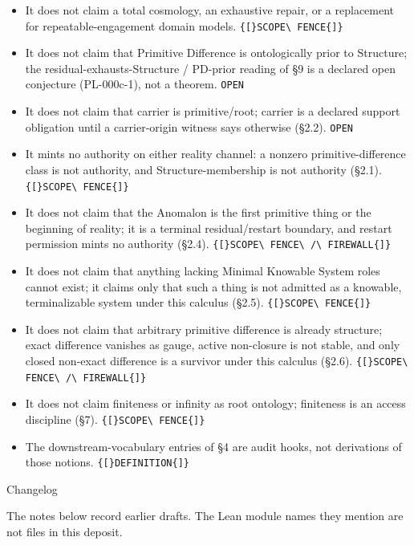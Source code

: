 \documentclass[
  10pt,
]{article}
\providecommand{\tightlist}{%
  \setlength{\itemsep}{0pt}\setlength{\parskip}{0pt}}
\providecommand{\tightlist}{%
  \setlength{\itemsep}{0pt}\setlength{\parskip}{0pt}}
\DeclareRobustCommand{\texttt}[1]{{\paperSymbolFont\nolinkurl{#1}}}
\begin{document}
\begin{itemize}
\tightlist
\item
  It does not claim a total cosmology, an exhaustive repair, or a replacement for repeatable-engagement domain models. \texttt{{[}SCOPE\ FENCE{]}}
\item
  It does not claim that Primitive Difference is ontologically prior to Structure; the residual-exhausts-Structure / PD-prior reading of §9 is a declared open conjecture (PL-000c-1), not a theorem. \texttt{OPEN}
\item
  It does not claim that carrier is primitive/root; carrier is a declared support obligation until a carrier-origin witness says otherwise (§2.2). \texttt{OPEN}
\item
  It mints no authority on either reality channel: a nonzero primitive-difference class is not authority, and Structure-membership is not authority (§2.1). \texttt{{[}SCOPE\ FENCE{]}}
\item
  It does not claim that the Anomalon is the first primitive thing or the beginning of reality; it is a terminal residual/restart boundary, and restart permission mints no authority (§2.4). \texttt{{[}SCOPE\ FENCE\ /\ FIREWALL{]}}
\item
  It does not claim that anything lacking Minimal Knowable System roles cannot exist; it claims only that such a thing is not admitted as a knowable, terminalizable system under this calculus (§2.5). \texttt{{[}SCOPE\ FENCE{]}}
\item
  It does not claim that arbitrary primitive difference is already structure; exact difference vanishes as gauge, active non-closure is not stable, and only closed non-exact difference is a survivor under this calculus (§2.6). \texttt{{[}SCOPE\ FENCE\ /\ FIREWALL{]}}
\item
  It does not claim finiteness or infinity as root ontology; finiteness is an access discipline (§7). \texttt{{[}SCOPE\ FENCE{]}}
\item
  The downstream-vocabulary entries of §4 are audit hooks, not derivations of those notions. \texttt{{[}DEFINITION{]}}
\end{itemize}

Changelog

The notes below record earlier drafts. The Lean module names they mention are not files in this deposit.
\end{document}
